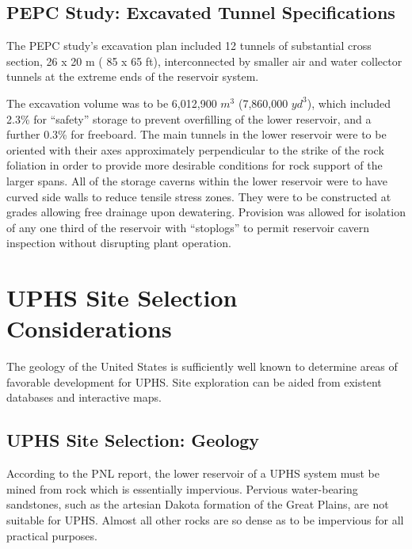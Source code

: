 \documentclass[hidelinks,12pt,a4paper]{article}
\begin{document}
\subsection{PEPC Study: Excavated Tunnel Specifications}
The PEPC study's excavation plan included 12 tunnels of substantial cross section, 26 x 20 m ( 85 x 65 ft), interconnected by smaller air and water collector tunnels at the extreme ends of the reservoir system.

The excavation volume was to be 6,012,900 $m^3$ (7,860,000 $yd^3$), which included 2.3\% for “safety” storage to prevent overfilling of the lower reservoir, and a further 0.3\% for freeboard. The main tunnels in the lower reservoir were to be oriented with their axes approximately perpendicular to the strike of the rock foliation in order to provide more desirable conditions for rock support of the larger spans. All of the storage caverns within the lower reservoir were to have curved side walls to reduce tensile stress zones. They were to be constructed at grades allowing free drainage upon dewatering. Provision was allowed for isolation of any one third of the reservoir with “stoplogs” to permit reservoir cavern inspection without disrupting plant operation.

\pagebreak[4]
\section{UPHS Site Selection Considerations}
The geology of the United States is sufficiently well known to determine areas of favorable development for UPHS. Site exploration can be aided from existent databases and interactive maps.

\subsection{UPHS Site Selection: Geology}
According to the PNL report, the lower reservoir of a UPHS system must be mined from rock which is essentially impervious. Pervious water-bearing sandstones, such as the artesian Dakota formation of the Great Plains, are not suitable for UPHS. Almost all other rocks are so dense as to be impervious for all practical purposes. \cite{UndergroundPumpedHydroelectricStorage}
\end{document}
